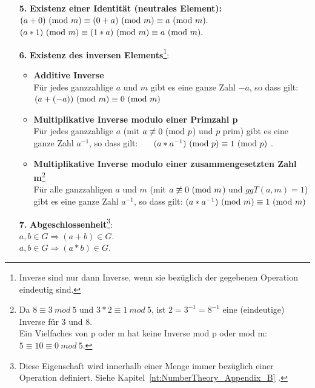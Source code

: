 \begin{refsegment}
\begin{itemize}
\item[\textbf{5.}] \textbf{Existenz einer Identität (neutrales Element):} \\
    $(a + 0) {\rm ~(mod~ } m) \equiv  (0 + a) {\rm ~(mod~ } m) \equiv  a {\rm ~(mod~ } m).$\\
    $(a * 1) {\rm ~(mod~ } m) \equiv  (1 * a) {\rm ~(mod~ } m) \equiv  a {\rm ~(mod~ } m).$




\item[\textbf{6.}] \textbf{Existenz des inversen Elements}\footnote{%
Inverse sind nur dann Inverse, wenn sie bezüglich der gegebenen Operation
eindeutig sind.
}:
\begin{itemize}[nosep]
\item \textbf{Additive Inverse}\\
   Für jedes ganzzahlige $a$ und $m$ gibt es eine ganze Zahl $-a$, so dass
   gilt:\\
   $(a + (-a)) {\rm ~(mod~}m) \equiv  0 {\rm ~(mod~ } m)$
\item \textbf{Multiplikative Inverse modulo einer Primzahl p}\\
   Für jedes ganzzahlige $a$ (mit $a \not\equiv 0 {\rm ~(mod~ } p$) und $p$
   prim) gibt es eine ganze Zahl $a^{-1}$, so dass gilt:~~~
   $(a * a^{-1}) {\rm ~(mod~ } p) \equiv 1 {\rm ~(mod~}p)$
   .
\item \textbf{Multiplikative Inverse modulo einer zusammengesetzten
           Zahl m}\footnote{%
    Da $8 \equiv 3 ~mod~ 5$ und $ 3 * 2 \equiv 1 ~mod~ 5$,
    ist $ 2 = 3^{-1} = 8^{-1}$ eine (eindeutige) Inverse für $3$ und $8$.\\
    Ein Vielfaches von p oder m hat keine Inverse mod p oder mod m:
    $5 \equiv 10 \equiv 0 ~mod~ 5$.
}\\
    Für alle ganzzahligen $a$ und $m$ (mit $a \not\equiv 0 {\rm ~(mod~ } m$)
    und $ggT(a,m) = 1$) gibt es eine ganze Zahl $a^{-1}$, so dass gilt:
    $(a * a^{-1}) {\rm ~(mod~ } m) \equiv 1 {\rm ~(mod~}m)$
\end{itemize}



\item[\textbf{7.}]  \textbf{Abgeschlossenheit}\footnote{%
\label{ftn-closed}Diese Eigenschaft wird innerhalb einer Menge immer bezüglich
     einer Operation definiert.
     Siehe Kapitel~\ref{nt:NumberTheory_Appendix_B}
     \glqq {}\grqq.
}:\\
$a, b \in G  \Longrightarrow  ( a + b ) \in G.$\\
$a, b \in G  \Longrightarrow  ( a * b ) \in G.$


\end{itemize}
\end{refsegment}
